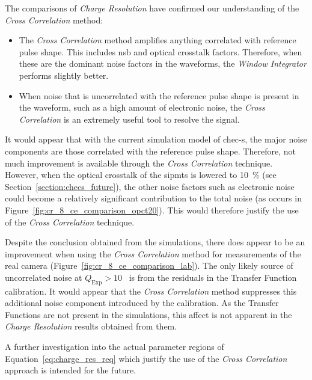 The comparisons of \textit{Charge Resolution} have confirmed our understanding of the \textit{Cross Correlation} method:
\begin{itemize}
\item The \textit{Cross Correlation} method amplifies anything correlated with reference pulse shape. This includes \gls{nsb} and optical crosstalk factors. Therefore, when these are the dominant noise factors in the waveforms, the \textit{Window Integrator} performs slightly better.
\item When noise that is uncorrelated with the reference pulse shape is present in the waveform, such as a high amount of electronic noise, the \textit{Cross Correlation} is an extremely useful tool to resolve the signal.
\end{itemize}
It would appear that with the current simulation model of \gls{chec-s}, the major noise components are those correlated with the reference pulse shape. Therefore, not much improvement is available through the \textit{Cross Correlation} technique. However, when the optical crosstalk of the \glspl{sipmt} is lowered to \SI{10}{\percent} (see Section~\ref{section:checs_future}), the other noise factors such as electronic noise could become a relatively significant contribution to the total noise (as occurs in Figure~\ref{fig:cr_8_ce_comparison_opct20}). This would therefore justify the use of the \textit{Cross Correlation} technique. 

Despite the conclusion obtained from the simulations, there does appear to be an improvement when using the \textit{Cross Correlation} method for measurements of the real camera (Figure~\ref{fig:cr_8_ce_comparison_lab}). The only likely source of uncorrelated noise at $Q_\text{Exp} > 10$~\si{\pe} is from the residuals in the Transfer Function calibration. It would appear that the \textit{Cross Correlation} method suppresses this additional noise component introduced by the calibration.  As the Transfer Functions are not present in the simulations, this affect is not apparent in the \textit{Charge Resolution} results obtained from them.

A further investigation into the actual parameter regions of Equation~\ref{eq:charge_res_req} which justify the use of the \textit{Cross Correlation} approach is intended for the future.